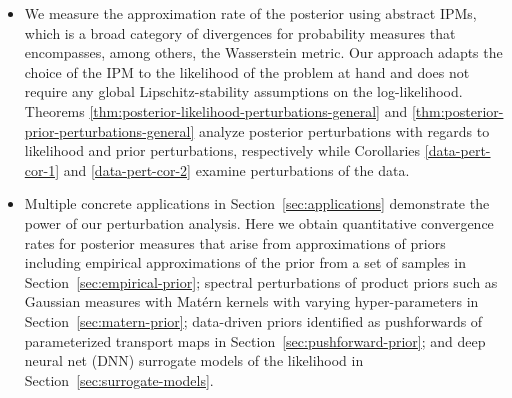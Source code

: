 \documentclass[final]{siamart171218}
\begin{document}
\begin{itemize}
\item 
We measure the approximation rate of the posterior using 
abstract IPMs, which is a broad category of divergences for probability measures that encompasses, among others, the Wasserstein metric. Our approach adapts the choice of the IPM to the likelihood of the 
problem at hand and does not require any global 
Lipschitz-stability assumptions on the log-likelihood.
Theorems  \ref{thm:posterior-likelihood-perturbations-general} and \ref{thm:posterior-prior-perturbations-general} analyze posterior perturbations with 
regards to likelihood and prior perturbations, respectively while
 Corollaries \ref{data-pert-cor-1} and \ref{data-pert-cor-2}  examine perturbations of the data.

\item Multiple concrete applications in Section~\ref{sec:applications} demonstrate the power of our 
perturbation analysis. Here we obtain quantitative 
convergence rates for posterior measures that arise 
from approximations of priors including 
empirical approximations of the prior from 
a set of samples in Section~\ref{sec:empirical-prior};   
spectral perturbations of product priors such as 
Gaussian measures with Mat{\'e}rn kernels with varying 
hyper-parameters in Section~\ref{sec:matern-prior}; 
data-driven priors identified as  pushforwards of 
parameterized transport maps in Section~\ref{sec:pushforward-prior};
and deep neural net (DNN) 
surrogate models of the likelihood in Section~\ref{sec:surrogate-models}.

\end{itemize}
\end{document}
